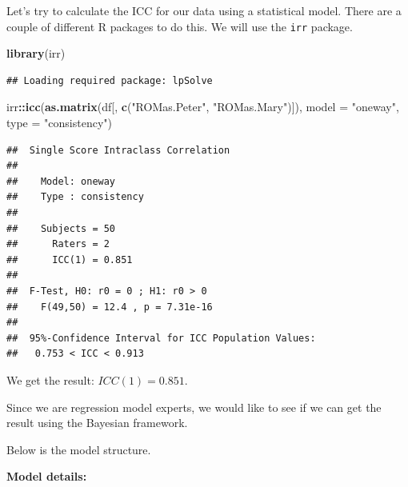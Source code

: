 \documentclass[
]{book}
\newenvironment{Shaded}{\begin{snugshade}}{\end{snugshade}}
\newcommand{\AttributeTok}[1]{\textcolor[rgb]{0.13,0.29,0.53}{#1}}
\newcommand{\FunctionTok}[1]{\textcolor[rgb]{0.13,0.29,0.53}{\textbf{#1}}}
\newcommand{\NormalTok}[1]{#1}
\newcommand{\SpecialCharTok}[1]{\textcolor[rgb]{0.81,0.36,0.00}{\textbf{#1}}}
\newcommand{\StringTok}[1]{\textcolor[rgb]{0.31,0.60,0.02}{#1}}
\begin{document}
Let's try to calculate the ICC for our data using a statistical model. There are a couple of different
R packages to do this. We will use the \texttt{irr} package.

\begin{Shaded}
\begin{Highlighting}[]
\FunctionTok{library}\NormalTok{(irr)}
\end{Highlighting}
\end{Shaded}

\begin{verbatim}
## Loading required package: lpSolve
\end{verbatim}

\begin{Shaded}
\begin{Highlighting}[]
\NormalTok{irr}\SpecialCharTok{::}\FunctionTok{icc}\NormalTok{(}\FunctionTok{as.matrix}\NormalTok{(df[, }\FunctionTok{c}\NormalTok{(}\StringTok{"ROMas.Peter"}\NormalTok{, }\StringTok{"ROMas.Mary"}\NormalTok{)]), }
    \AttributeTok{model =} \StringTok{"oneway"}\NormalTok{, }\AttributeTok{type =} \StringTok{"consistency"}\NormalTok{)}
\end{Highlighting}
\end{Shaded}

\begin{verbatim}
##  Single Score Intraclass Correlation
## 
##    Model: oneway 
##    Type : consistency 
## 
##    Subjects = 50 
##      Raters = 2 
##      ICC(1) = 0.851
## 
##  F-Test, H0: r0 = 0 ; H1: r0 > 0 
##    F(49,50) = 12.4 , p = 7.31e-16 
## 
##  95%-Confidence Interval for ICC Population Values:
##   0.753 < ICC < 0.913
\end{verbatim}

We get the result: \(ICC(1) = 0.851\).

Since we are regression model experts, we would like to see if we can get the result using the Bayesian
framework.

Below is the model structure.

\textbf{Model details:}
\end{document}

